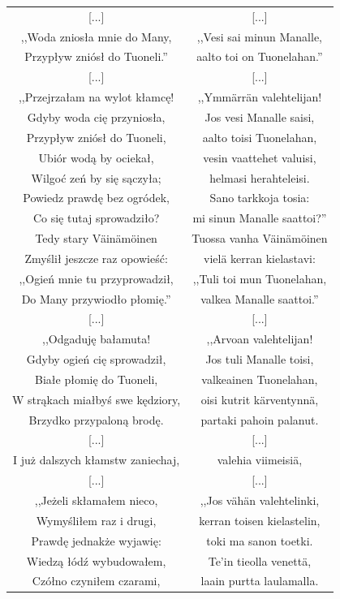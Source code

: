\documentclass[11pt,a4paper,twoside]{report}
\begin{document}
{\begin{longtable}{c c}
{[...]} & {[...]}\\
,,Woda zniosła mnie do Many, 		&  ,,Vesi sai minun Manalle, \\
Przypływ zniósł do Tuoneli.'' 		&  aalto toi on Tuonelahan.'' \\
{[...]} & {[...]}\\
,,Przejrzałam na wylot kłamcę! 		&  ,,Ymmärrän valehtelijan! \\
Gdyby woda cię przyniosła, 		&  Jos vesi Manalle saisi, \\
Przypływ zniósł do Tuoneli, 		&  aalto toisi Tuonelahan, \\
Ubiór wodą by ociekał, 			&  vesin vaattehet valuisi,	 \\
Wilgoć zeń by się sączyła; 		&  helmasi herahteleisi. \\
Powiedz prawdę bez ogródek, 		&  Sano tarkkoja tosia: \\
Co się tutaj sprowadziło? 		&  mi sinun Manalle saattoi?'' \\
Tedy stary Väinämöinen			&  Tuossa vanha Väinämöinen \\
Zmyślił jeszcze raz opowieść: 		&  vielä kerran kielastavi: \\
,,Ogień mnie tu przyprowadził, 		&  ,,Tuli toi mun Tuonelahan, \\
Do Many przywiodło płomię.'' 		&  valkea Manalle saattoi.'' \\
{[...]} & {[...]}\\
,,Odgaduję bałamuta! 			&  ,,Arvoan valehtelijan! \\
Gdyby ogień cię sprowadził, 		&  Jos tuli Manalle toisi, \\
Białe płomię do Tuoneli, 			&  valkeainen Tuonelahan, \\
W strąkach miałbyś swe kędziory, 	&  oisi kutrit kärventynnä, \\
Brzydko przypaloną brodę. 		&  partaki pahoin palanut. \\
{[...]} & {[...]}\\
I już dalszych kłamstw zaniechaj, 	&  valehia viimeisiä, \\
{[...]} & {[...]}\\
,,Jeżeli skłamałem nieco, 		&  ,,Jos vähän valehtelinki, \\
Wymyśliłem raz i drugi, 			&  kerran toisen kielastelin, \\
Prawdę jednakże wyjawię: 		&  toki ma sanon toetki. \\
Wiedzą łódź wybudowałem, 		&  Te'in tieolla venettä, \\
Czółno czyniłem czarami, 		&  laain purtta laulamalla. \\

\end{longtable}}
\end{document}
